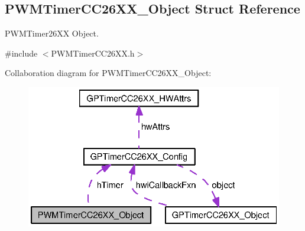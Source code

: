 \subsection{P\+W\+M\+Timer\+C\+C26\+X\+X\+\_\+\+Object Struct Reference}
\label{struct_p_w_m_timer_c_c26_x_x___object}


P\+W\+M\+Timer26\+X\+X Object.  




{\ttfamily \#include $<$P\+W\+M\+Timer\+C\+C26\+X\+X.\+h$>$}



Collaboration diagram for P\+W\+M\+Timer\+C\+C26\+X\+X\+\_\+\+Object\+:
\nopagebreak
\begin{figure}[H]
\begin{center}
\leavevmode
\includegraphics[width=321pt]{struct_p_w_m_timer_c_c26_x_x___object__coll__graph}
\end{center}
\end{figure}
